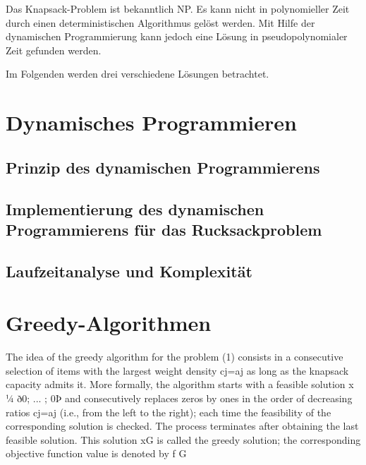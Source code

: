 \documentclass[12pt]{report}
\begin{document}
Das Knapsack-Problem ist bekanntlich NP. Es kann nicht in polynomieller Zeit durch einen deterministischen Algorithmus gelöst werden. Mit Hilfe der dynamischen Programmierung kann jedoch eine Lösung in pseudopolynomialer Zeit gefunden werden. \cite{assi8672677}

Im Folgenden werden drei verschiedene Lösungen betrachtet.


\newpage
\chapter{Dynamisches Programmieren}


\pagebreak
\section{Prinzip des dynamischen Programmierens}

\pagebreak
\section{Implementierung des dynamischen Programmierens für das Rucksackproblem}


\cite{pferschy1999dynamic}

\pagebreak
\section{Laufzeitanalyse und Komplexität}



\newpage
\chapter{Greedy-Algorithmen}

The idea of the greedy algorithm for the problem (1) consists in a consecutive selection of items with the largest weight density cj=aj as long as the
knapsack capacity admits it. More formally, the algorithm starts with a feasible solution x ¼ ð0; ... ; 0Þ and consecutively replaces zeros by ones in the
order of decreasing ratios cj=aj (i.e., from the left to the right); each time the
feasibility of the corresponding solution is checked. The process terminates
after obtaining the last feasible solution. This solution xG is called the greedy
solution; the corresponding objective function value is denoted by f G
\cite{diubin2003average}
\end{document}
